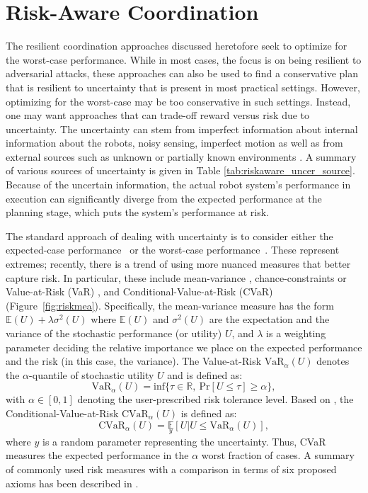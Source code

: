 \section{Risk-Aware Coordination} \label{sec:risk_cord}
The resilient coordination approaches discussed heretofore seek to optimize for the worst-case performance. While in most cases, the focus is on being resilient to adversarial attacks, these approaches can also be used to find a conservative plan that is resilient to uncertainty that is present in most practical settings. However, optimizing for the worst-case may be too conservative in such settings. Instead, one may want approaches that can trade-off reward versus risk due to uncertainty. The uncertainty can stem from imperfect information about internal information about the robots, noisy sensing, imperfect motion \cite{martinelli2005multi} as well as from external sources such as unknown or partially known environments \cite{zhou2018approximation,chung2019risk}. A summary of various sources of uncertainty is given in Table \ref{tab:riskaware_uncer_source}. Because of the uncertain information, the actual robot system's performance in execution can significantly diverge from the expected performance at the planning stage, which puts the system's performance at risk. 

The standard approach of dealing with uncertainty is to consider either the expected-case performance~\cite{prorok2019redundant,peltzer2020stt} or the worst-case performance~\cite{zhou2017active,zhou2018active,yel2018self}. These represent extremes; recently, there is a trend of using more nuanced measures that better capture risk. In particular, these include mean-variance \cite{chung2019risk,toubeh2019risk}, chance-constraints or Value-at-Risk (VaR) \cite{yang2017algorithm}, and Conditional-Value-at-Risk (CVaR) \cite{chow2015risk,chow2017risk,zhou2018approximation} (Figure~\ref{fig:riskmea}). Specifically, the mean-variance measure has the form $\mathbb{E}(U) + \lambda\sigma^2(U)$ where $\mathbb{E}(U)$ and $\sigma^2(U)$ are the expectation and the variance of the stochastic performance (or utility) $U$, and $\lambda$ is a weighting parameter deciding the relative importance we place on the expected performance and the risk (in this case, the variance). The Value-at-Risk $\text{VaR}_\alpha (U)$ denotes the $\alpha$-quantile of stochastic utility $U$ and is defined as:
$$
\text{VaR}_{\alpha}(U) = \text{inf} \{\tau\in\mathbb{R}, ~\text{Pr} [U\leq \tau] \geq \alpha\},
$$  
with $\alpha \in [0,1]$ denoting the user-prescribed risk tolerance level.
Based on , the Conditional-Value-at-Risk $\text{CVaR}_{\alpha}(U)$ is defined as: 
$$
\text{CVaR}_{\alpha}(U) = \underset{y}{\mathbb{E}}[U|U\leq \text{VaR}_{\alpha}(U)],
$$
where $y$ is a random parameter representing the uncertainty. Thus, CVaR measures the expected performance in the $\alpha$ worst fraction of cases. A summary of commonly used risk measures with a comparison in terms of six proposed axioms has been described in \cite{majumdar2020should}. 

